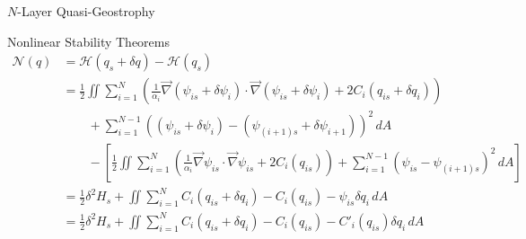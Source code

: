 \documentclass[12pt]{article}
\begin{document}
\begin{section}{$N$-Layer Quasi-Geostrophy}
\begin{subsection}{Nonlinear Stability Theorems}
        \begin{align*}
            \mathcal{N}(q)
            & = \mathcal{H}(q_s + \delta q) - \mathcal{H}(q_s) \\
            &= \frac12 \iint \sum_{i=1}^N \left( \frac{1}{\alpha_i}\vec\nabla (\psi_{is} + \delta\psi_i) \cdot \vec\nabla (\psi_{is} + \delta\psi_i) + 2C_i(q_{is} + \delta q_i) \right) \\
            &\quad\quad + \sum_{i=1}^{N-1}((\psi_{is} + \delta\psi_i) - (\psi_{(i+1)s} + \delta\psi_{i+1}))^2 \, dA \\
            &\quad\quad - \left[ \frac12 \iint \sum_{i=1}^N \left( \frac{1}{\alpha_i}\vec\nabla \psi_{is} \cdot \vec\nabla \psi_{is} + 2C_i(q_{is}) \right) + \sum_{i=1}^{N-1}(\psi_{is} - \psi_{(i+1)s})^2 \, dA \right] \\
            &= \frac12 \delta^2 H_s + \iint \sum_{i=1}^N C_i(q_{is} + \delta q_i) - C_i(q_{is}) - \psi_{is}\delta q_i \, dA \\
            &= \frac12 \delta^2 H_s + \iint \sum_{i=1}^N C_i(q_{is} + \delta q_i) - C_i(q_{is}) - C'_i(q_{is})\delta q_i \, dA \\
        \end{align*}
    \end{subsection}
\end{section}
\end{document}
